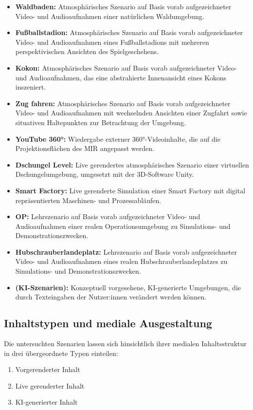 \begin{itemize}
    \item \textbf{Waldbaden:} Atmosphärisches Szenario auf Basis vorab aufgezeichneter Video- und Audioaufnahmen einer natürlichen Waldumgebung.
    \item \textbf{Fußballstadion:} Atmosphärisches Szenario auf Basis vorab aufgezeichneter Video- und Audioaufnahmen eines Fußballstadions mit mehreren perspektivischen Ansichten des Spielgeschehens.
    \item \textbf{Kokon:} Atmosphärisches Szenario auf Basis vorab aufgezeichneter Video- und Audioaufnahmen, das eine abstrahierte Innenansicht eines Kokons inszeniert.
    \item \textbf{Zug fahren:} Atmosphärisches Szenario auf Basis vorab aufgezeichneter Video- und Audioaufnahmen mit wechselnden Ansichten einer Zugfahrt sowie situativen Haltepunkten zur Betrachtung der Umgebung.
    \item \textbf{YouTube 360°:} Wiedergabe externer 360°-Videoinhalte, die auf die Projektionsflächen des MIR angepasst werden.
    \item \textbf{Dschungel Level:} Live gerendertes atmosphärisches Szenario einer virtuellen Dschungelumgebung, umgesetzt mit der 3D-Software Unity.
    \item \textbf{Smart Factory:} Live gerenderte Simulation einer Smart Factory mit digital repräsentierten Maschinen- und Prozessabläufen.
    \item \textbf{OP:} Lehrszenario auf Basis vorab aufgezeichneter Video- und Audioaufnahmen einer realen Operationsumgebung zu Simulations- und Demonstrationszwecken.
    \item \textbf{Hubschrauberlandeplatz:} Lehrszenario auf Basis vorab aufgezeichneter Video- und Audioaufnahmen eines realen Hubschrauberlandeplatzes zu Simulations- und Demonstrationszwecken.
    \item \textbf{(KI-Szenarien):} Konzeptuell vorgesehene, KI-generierte Umgebungen, die durch Texteingaben der Nutzer:innen verändert werden können.
\end{itemize}


\subsection{Inhaltstypen und mediale Ausgestaltung}
Die untersuchten Szenarien lassen sich hinsichtlich ihrer medialen Inhaltsstruktur in drei über\-geord\-nete Typen einteilen:

\begin{enumerate}
\item Vorgerenderter Inhalt
\item Live gerenderter Inhalt
\item KI-generierter Inhalt
\end{enumerate}

